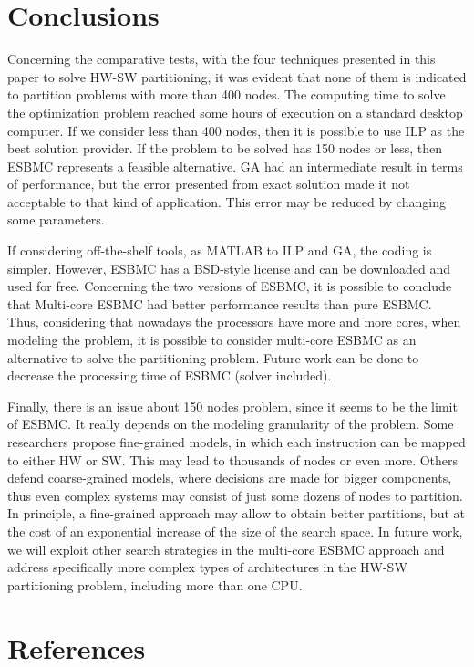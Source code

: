 \section{Conclusions}
Concerning the comparative tests, with the four techniques presented in this paper to solve HW-SW partitioning, it was evident that none of them is indicated to partition problems with more than 400 nodes. The computing time to solve the optimization problem reached some hours of execution on a standard desktop computer. If we consider less than 400 nodes, then it is possible to use ILP as the best solution provider. If the problem to be solved has 150 nodes or less, then ESBMC represents a feasible alternative. GA had an intermediate result in terms of performance, but the error presented from exact solution made it not acceptable to that kind of application. This error may be reduced by changing some parameters.

If considering off-the-shelf tools, as MATLAB to ILP and GA, the coding is simpler. However, ESBMC has a BSD-style license and can be downloaded and used for free. Concerning the two versions of ESBMC, it is possible to conclude that Multi-core ESBMC had better performance results than pure ESBMC. Thus, considering that nowadays the processors have more and more cores, when modeling the problem, it is possible to consider multi-core ESBMC as an alternative to solve the partitioning problem. Future work can be done to decrease the processing time of ESBMC (solver included).

Finally, there is an issue about 150 nodes problem, since it seems to be the limit of ESBMC. It really depends on the modeling granularity of the problem. Some researchers propose fine-grained models, in which each instruction can be mapped to either HW or SW. This may lead to thousands of nodes or even more. Others defend coarse-grained models, where decisions are made for bigger components, thus even complex systems may consist of just some dozens of nodes to partition. In principle, a fine-grained approach may allow to obtain better partitions, but at the cost of an exponential increase of the size of the search space. In future work, we will exploit other search strategies in the multi-core ESBMC approach and address specifically more complex types of architectures in the HW-SW partitioning problem, including more than one CPU.
\section{References}

